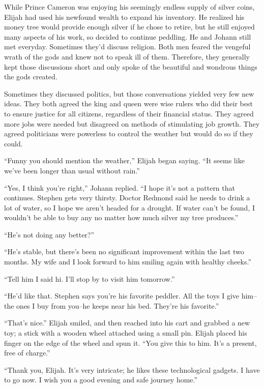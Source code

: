 While Prince Cameron was enjoying his seemingly endless supply of silver coins, Elijah had used his newfound wealth to expand his inventory. He realized his money tree would provide enough silver if he chose to retire, but he still enjoyed many aspects of his work, so decided to continue peddling. He and Johann still met everyday. Sometimes they'd discuss religion. Both men feared the vengeful wrath of the gods and knew not to speak ill of them. Therefore, they generally kept those discussions short and only spoke of the beautiful and wondrous things the gods created.

Sometimes they discussed politics, but those conversations yielded very few new ideas. They both agreed the king and queen were wise rulers who did their best to ensure justice for all citizens, regardless of their financial status. They agreed more jobs were needed but disagreed on methods of stimulating job growth. They agreed politicians were powerless to control the weather but would do so if they could.

“Funny you should mention the weather,” Elijah began saying. “It seems like we've been longer than usual without rain.”

“Yes, I think you're right,” Johann replied. “I hope it's not a pattern that continues. Stephen gets very thirsty. Doctor Redmond said he needs to drink a lot of water, so I hope we aren't headed for a drought. If water can't be found, I wouldn't be able to buy any no matter how much silver my tree produces.”

“He's not doing any better?”

“He's stable, but there's been no significant improvement within the last two months. My wife and I look forward to him smiling again with healthy cheeks.”

“Tell him I said hi. I'll stop by to visit him tomorrow.”

“He'd like that. Stephen says you're his favorite peddler. All the toys I give him--the ones I buy from you--he keeps near his bed. They're his favorite.”

“That's nice.” Elijah smiled, and then reached into his cart and grabbed a new toy; a stick with a wooden wheel attached using a small pin. Elijah placed his finger on the edge of the wheel and spun it. “You give this to him. It's a present, free of charge.”

“Thank you, Elijah. It's very intricate; he likes these technological gadgets. I have to go now. I wish you a good evening and safe journey home.”

